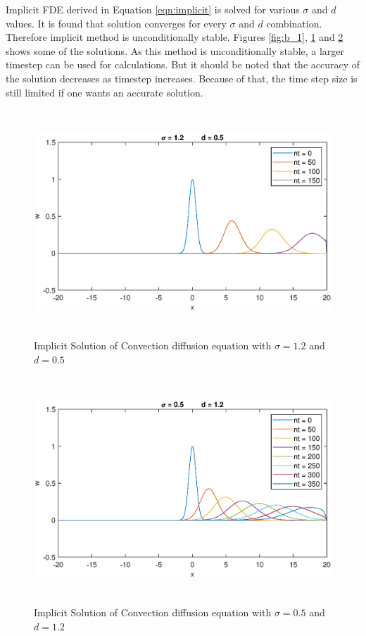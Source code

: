 \documentclass[letterpaper,12pt]{article}
\begin{document}
Implicit FDE derived in Equation \ref{eqn:implicit} is solved for various $\sigma$ and $d$ values. 
It is found that solution converges for every $\sigma$ and $d$ combination. Therefore implicit method 
is unconditionally stable. Figures \ref{fig:b_1}, \ref{fig:b_2} and \ref{fig:b_3} shows some of the solutions. 
As this method is unconditionally stable, a larger timestep can be used for calculations. But it should be noted that the
accuracy of the solution decreases as timestep increases. Because of that, the time step size is still limited if one wants
an accurate solution.

\newpage

\begin{figure}[!h] 
	\centering 
	\includegraphics[max height=8.5cm]{graphs/Bonus/sigma12d05.eps}
	\caption{Implicit Solution of Convection diffusion equation with $\sigma= 1.2$ and $d=0.5$}
	\label{fig:b_2}
\end{figure}

\begin{figure}[!h] 
	\centering 
	\includegraphics[max height=8.5cm]{graphs/Bonus/sigma05d12.eps}
	\caption{Implicit Solution of Convection diffusion equation with $\sigma= 0.5$ and $d=1.2$}
	\label{fig:b_3}
\end{figure}
\end{document}
